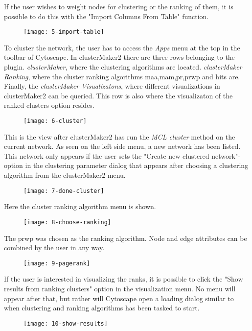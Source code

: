 If the user wishes to weight nodes for clustering or the ranking of them, it is
possible to do this with the "Import Columns From Table" function.
\begin{figure}[H]
    \label{fig:}
    \texttt{[image: 5-import-table]}
\end{figure}

To cluster the network, the user has to access the \textit{Apps} menu at the top
in the toolbar of Cytoscape. In clusterMaker2 there are three rows belonging
to the plugin. \textit{clusterMaker}, where the clustering algorithms are
located. \textit{clusterMaker Ranking}, where the cluster ranking algorithms
\gls{maa},\gls{mam},\gls{pr},\gls{prwp} and \gls{hits} are. Finally, the
\textit{clusterMaker Visualizatons}, where different visualizations in
clusterMaker2 can be queried. This row is also where the visualizaton of the
ranked clusters option resides.
\begin{figure}[H]
    \label{fig:}
    \texttt{[image: 6-cluster]}
\end{figure}

This is the view after clusterMaker2 has run the \textit{MCL cluster} method on
the current network. As seen on the left side menu, a new network has been
listed. This network only appears if the user sets the "Create new clustered
network"-option in the clustering parameter dialog that appears after choosing a
clustering algorithm from the clusterMaker2 menu.
\begin{figure}[H]
    \texttt{[image: 7-done-cluster]}
    \label{fig:}
\end{figure}

Here the cluster ranking algorithm menu is shown.
\begin{figure}[H]
    \label{fig:}
    \texttt{[image: 8-choose-ranking]}
\end{figure}

The \gls{prwp} was chosen as the ranking algorithm. Node and edge attributes can
be combined by the user in any way. 
\begin{figure}[H]
    \label{fig:}
    \texttt{[image: 9-pagerank]}
\end{figure}

If the user is interested in visualizing the ranks, it is possible to click the
"Show results from ranking clusters" option in the visualization menu. No menu
will appear after that, but rather will Cytoscape open a loading dialog similar
to when clustering and ranking algorithms has been tasked to start.
\begin{figure}[H]
    \label{fig:}
    \texttt{[image: 10-show-results]}
\end{figure}

